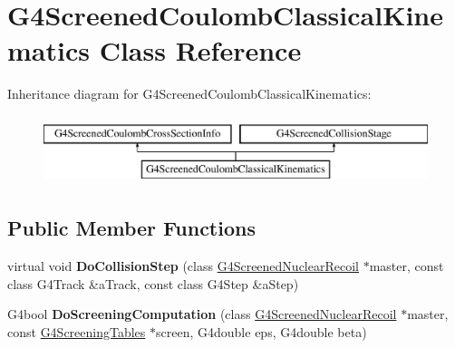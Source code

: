 \hypertarget{classG4ScreenedCoulombClassicalKinematics}{\section{G4\-Screened\-Coulomb\-Classical\-Kinematics Class Reference}
\label{classG4ScreenedCoulombClassicalKinematics}
}
Inheritance diagram for G4\-Screened\-Coulomb\-Classical\-Kinematics\-:\begin{figure}[H]
\begin{center}
\leavevmode
\includegraphics[height=2.000000cm]{classG4ScreenedCoulombClassicalKinematics}
\end{center}
\end{figure}
\subsection*{Public Member Functions}
\begin{DoxyCompactItemize}
\item 
\hypertarget{classG4ScreenedCoulombClassicalKinematics_a4d9894d234cdebccd4005d3a23e03db1}{virtual void {\bfseries Do\-Collision\-Step} (class \hyperlink{classG4ScreenedNuclearRecoil}{G4\-Screened\-Nuclear\-Recoil} $\ast$master, const class G4\-Track \&a\-Track, const class G4\-Step \&a\-Step)}\label{classG4ScreenedCoulombClassicalKinematics_a4d9894d234cdebccd4005d3a23e03db1}

\item 
\hypertarget{classG4ScreenedCoulombClassicalKinematics_a8e8d7873c4f99edac95ed00100d54844}{G4bool {\bfseries Do\-Screening\-Computation} (class \hyperlink{classG4ScreenedNuclearRecoil}{G4\-Screened\-Nuclear\-Recoil} $\ast$master, const \hyperlink{structG4ScreeningTables}{G4\-Screening\-Tables} $\ast$screen, G4double eps, G4double beta)}\label{classG4ScreenedCoulombClassicalKinematics_a8e8d7873c4f99edac95ed00100d54844}

\end{DoxyCompactItemize}
